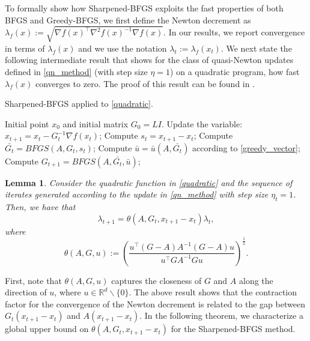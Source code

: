 \documentclass[11pt]{article}
\numberwithin{assumption}{section}
\numberwithin{remark}{section}
\numberwithin{theorem}{section}
\newtheorem{lemma}[theorem]{Lemma}
\begin{document}
To formally show how Sharpened-BFGS exploits the fast properties of both BFGS and Greedy-BFGS, we first define the Newton decrement as $\lambda_{f}(x) := \sqrt{\nabla{f(x)}^\top \nabla^2 f(x)^{-1} \nabla{f(x)}}$. In our results, we report convergence in terms of $   \lambda_{f}(x)$ and we use the notation $\lambda_t := \lambda_{f}(x_t)$. We next state the following intermediate result  that shows for the class of quasi-Newton updates defined in \eqref{qn_method} (with step size $\eta=1$) on a quadratic program, how fast  $\lambda_{f}(x)$ converges to zero. The proof of this result can be found in \cite{rodomanov2020rates}.

\begin{algorithm}[t]
\caption{Sharpened-BFGS applied to \eqref{quadratic}.}\label{algo_quadratic}
\begin{algorithmic}[1] 
{\REQUIRE Initial point $x_0$ and initial matrix $G_0 = LI$.
    \STATE Update the variable: $x_{t + 1} = x_t - G_t^{-1} \nabla{f(x_t)}$;
    \STATE Compute  $s_t = x_{t + 1} - x_t$;
    \STATE Compute $\bar{G_t} = BFGS(A, G_t, s_t)$;
    \STATE Compute  $\bar{u} = \bar{u}(A, \bar{G_t})$ according to \eqref{greedy_vector};
    \STATE Compute $G_{t + 1} = BFGS(A, \bar{G_t}, \bar{u})$;
\ENDFOR}
\end{algorithmic}\end{algorithm}

\begin{lemma}\label{lemma_quadratic_theta}
Consider the quadratic function in \eqref{quadratic} and the sequence of iterates generated according to the update in \eqref{qn_method} with step size $\eta_t=1$. 
 Then, we have that
\begin{equation}\label{lemma_quadratic_theta_1}
    \lambda_{t+1} = \theta(A, G_t, x_{t + 1} - x_{t})\lambda_{t},
\end{equation}
where 
\begin{equation}\label{theta}
\theta(A,G,u) := \left(\frac{u^\top (G - A) A^{-1} (G - A) u}{u^\top G A^{-1} G u}\right)^{\frac{1}{2}}.
\end{equation}
\end{lemma}

First, note that $\theta(A,G,u)$ captures the closeness of $G$ and $A$ along the direction of $u$, where $u \in \mathbb{R}^{d}\backslash\{0\}$. The above result shows that the contraction factor for the convergence of the Newton decrement is related to the gap between $G_t(x_{t+1}-x_t)$ and $A(x_{t+1}-x_t)$. In the following theorem, we characterize a global upper bound on $\theta(A, G_t, x_{t + 1} - x_{t})  $ for the Sharpened-BFGS method.
\end{document}
